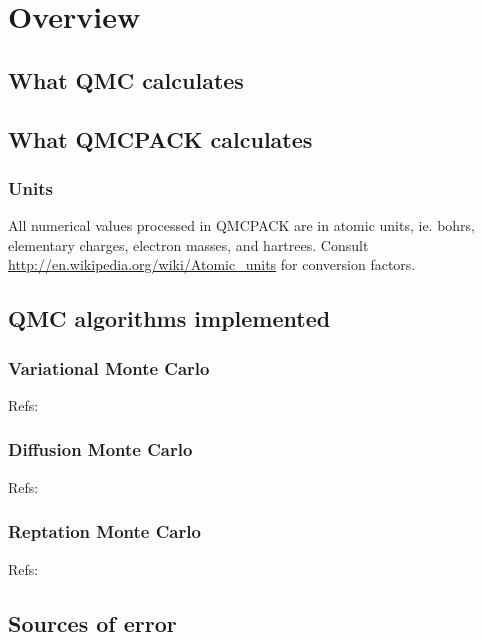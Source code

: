 \chapter{Overview}
\section{What QMC calculates}
\section{What QMCPACK calculates}
\subsection{Units}
All numerical values processed in QMCPACK are in atomic units, ie. bohrs, elementary charges, electron masses, and hartrees.  Consult \url{http://en.wikipedia.org/wiki/Atomic_units} for conversion factors.
\section{QMC algorithms implemented}
\subsection{Variational Monte Carlo}
Refs: \cite{PhysRev.138.A442,PhysRevB.16.3081}
\subsection{Diffusion Monte Carlo}
Refs: \cite{Ceperley1979,Schmidt1984}
\subsection{Reptation Monte Carlo}
Refs: \cite{PhysRevLett.82.4745}
\section{Sources of error}
